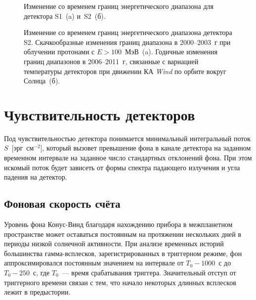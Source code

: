 \begin{figure}[h]
  \begin{minipage}[h]{0.5\textwidth}
  \end{minipage}
  \hfill
  \begin{minipage}[h]{0.5\textwidth}
  \end{minipage}
  \caption[Изменение со временем границ энергетического диапазона для детектора S1 и~S2.]
  {Изменение со временем границ энергетического диапазона для детектора S1~(a) и~S2~(б).}
  \label{img:KW_E_boundaries}  
\end{figure}

\begin{figure}[h]
  \begin{minipage}[h]{0.5\textwidth}
  \end{minipage}
  \hfill
  \begin{minipage}[h]{0.5\textwidth}
  \end{minipage}
  \caption[Изменение со временем границ энергетического диапазона детектора S2 
  в 2000--2003~г и 2006--2011~г.]
  {Изменение со временем границ энергетического диапазона детектора S2. 
  Скачкообразные изменения границ диапазона в 2000--2003~г при облучении протонами с $E>100$~МэВ~(a). 
  Годичные изменения границ диапазонов в 2006--2011~г, связанные с вариацией температуры детекторов 
  при движении КА \textit{Wind} по орбите вокруг Солнца~(б).}
  \label{img:KW_E_boundaries_features}  
\end{figure}

\section{Чувствительность детекторов}
Под чувствительностью детектора понимается минимальный интегральный поток $S$~[эрг~см$^{-2}$], 
который вызовет превышение фона в канале детектора на заданном временном интервале 
на заданное число стандартных отклонений фона. При этом искомый поток будет зависеть 
от формы спектра падающего излучения и угла падения на детектор.

\subsection{Фоновая скорость счёта}\label{sec:Bg_rate}
Уровень фона Конус-Винд благодаря нахождению прибора в межпланетном пространстве 
может оставаться постоянным на протяжении нескольких дней в периоды низкой 
солнечной активности. При анализе временных историй большинства гамма-всплесков, 
зарегистрированных в триггерном режиме, фон аппроксимировался 
постоянным значением на интервале от $T_0 - 1000$~с до $T_0 - 250$~с, 
где $T_0$~--- время срабатывания триггера. Значительный отступ от триггерного 
времени связан с тем, что начало некоторых длинных всплесков лежит в предыстории. 

